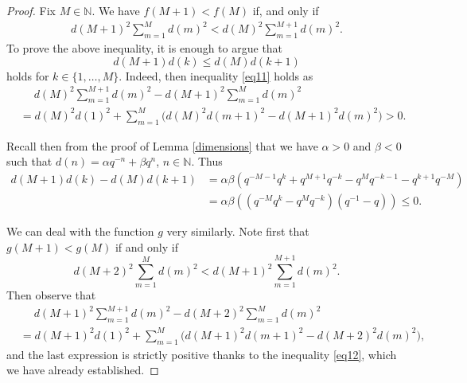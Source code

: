 \documentclass[11 pt, leqno]{amsart}
\newcommand{\NN}{\mathbb{N}}
\theoremstyle{definition}
\numberwithin{equation}{section}
\begin{document}
\begin{proof}
	Fix $M\in\NN$. We have $f(M+1)<f(M)$ if, and only if
	\begin{equation}\label{eq11}\begin{split}
	d(M+1)^2\sum_{m=1}^{M} d(m)^2
	< d(M)^2 \sum_{m=1}^{M+1} d(m)^2.
	\end{split}\end{equation}
	To prove the above inequality, it is enough to argue that 
	\begin{equation}\label{eq12}
	d(M+1) d(k) \le  d(M) d(k+1) 
	\end{equation}
	holds for $k\in\{1,\dotsc, M\}$. Indeed, then inequality \eqref{eq11} holds as
	\begin{align*}
&\quad\;	d(M)^2  \sum_{m=1}^{M+1} d(m)^2 - 
	d(M+1)^2  \sum_{m=1}^{M} d(m)^2 \\&=
	d(M)^2  d(1)^2 +
	\sum_{m=1}^{M}  \bigl( d(M)^2d(m+1)^2 - d(M+1)^2 d(m)^2)>0.
	\end{align*}
	
	Recall then from the proof of Lemma \ref{dimensions} that we have $\alpha>0$ and $\beta <0$ such that $d(n) = \alpha q^{-n} + \beta q^n$, $n \in \NN$.
	Thus 
	\begin{align*} 	d(M+1) d(k) - d(M) d(k+1) &= \alpha \beta (q^{-M-1} q^k + q^{M+1} q^{-k} - q^M q^{-k-1}
	- q^{k+1} q^{-M}) 
	\\& = \alpha \beta ((q^{-M} q^k - q^M q^{-k})(q^{-1} - q))\le 0.
	\end{align*}
	
We can deal with the function $g$ very similarly. Note first that $g(M+1)<g(M)$ if and only if
\[
d(M+2)^2\sum_{m=1}^{M} d(m)^2
< d(M+1)^2 \sum_{m=1}^{M+1} d(m)^2.
\]
Then observe that
\begin{align*}
&\quad\;
d(M+1)^2  \sum_{m=1}^{M+1} d(m)^2- 
d(M+2)^2  \sum_{m=1}^{M} d(m)^2 \\
&=
d(M+1)^2  d(1)^2 +
\sum_{m=1}^{M}  \bigl( d(M+1)^2d(m+1)^2 - d(M+2)^2 d(m)^2\bigr),
\end{align*}	
and the last expression is strictly positive thanks to the inequality \eqref{eq12}, which we have already established.
	
	
\end{proof}
\end{document}
